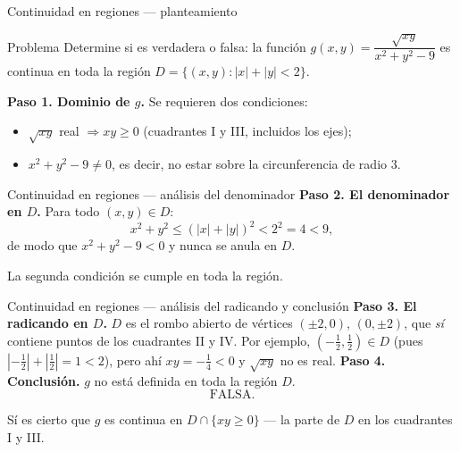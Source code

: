 \documentclass[11pt,aspectratio=169]{beamer}
\begin{document}
\begin{frame}{Continuidad en regiones --- planteamiento}
  \begin{block}{Problema}
    Determine si es verdadera o falsa: la función $g(x,y)=\dfrac{\sqrt{xy}}{x^2+y^2-9}$ es continua en toda la región $D=\{(x,y):|x|+|y|<2\}$.
  \end{block}
  \pause
  \textbf{Paso 1. Dominio de $g$.} Se requieren dos condiciones:
  \begin{itemize}
    \item $\sqrt{xy}$ real $\Rightarrow xy\ge 0$ (cuadrantes I y III, incluidos los ejes);
    \item $x^2+y^2-9\neq 0$, es decir, no estar sobre la circunferencia de radio $3$.
  \end{itemize}
\end{frame}

\begin{frame}{Continuidad en regiones --- análisis del denominador}
  \textbf{Paso 2. El denominador en $D$.} Para todo $(x,y)\in D$:
  \[
    x^2+y^2\le(|x|+|y|)^2<2^2=4<9,
  \]
  \pause
  de modo que $x^2+y^2-9<0$ y nunca se anula en $D$.
  \pause
  \begin{center}\normalsize\color{tealx} La segunda condición se cumple en toda la región.\end{center}
\end{frame}

\begin{frame}{Continuidad en regiones --- análisis del radicando y conclusión}
  \textbf{Paso 3. El radicando en $D$.} $D$ es el rombo abierto de vértices $(\pm 2,0)$, $(0,\pm 2)$, que \emph{sí} contiene puntos de los cuadrantes II y IV.
  \pause
  Por ejemplo, $\left(-\tfrac12,\tfrac12\right)\in D$ (pues $\left|-\tfrac12\right|+\left|\tfrac12\right|=1<2$), pero ahí $xy=-\tfrac14<0$ y $\sqrt{xy}$ no es real.
  \pause
  \textbf{Paso 4. Conclusión.} $g$ no está definida en toda la región $D$.
  \pause
  \[
    \boxed{\text{FALSA.}}
  \]
  \pause
  \begin{center}\small\color{gray60} Sí es cierto que $g$ es continua en $D\cap\{xy\ge 0\}$ --- la parte de $D$ en los cuadrantes I y III.\end{center}
\end{frame}

\end{document}
